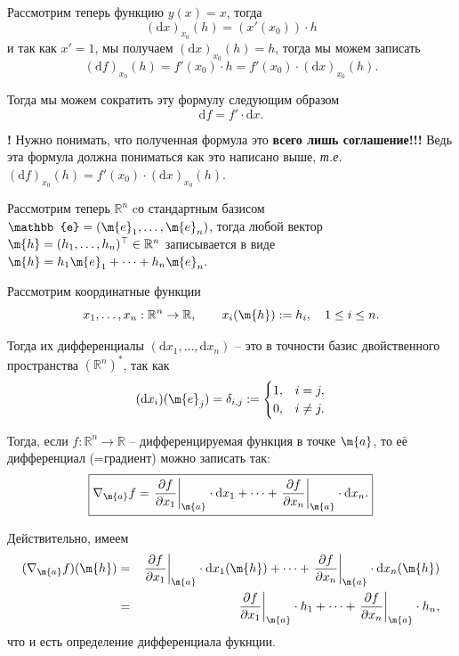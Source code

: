 Рассмотрим теперь функцию $y(x) = x$, тогда 
\[
 (\mathrm{d}x)_{x_0}(h) = (x'(x_0))\cdot h
\]
и так как $x' = 1$, мы получаем $(\mathrm{d}x)_{x_0}(h) = h$, тогда мы можем записать
\[
 (\mathrm{d}f)_{x_0}(h) = f'(x_0) \cdot h = f'(x_0) \cdot  (\mathrm{d}x)_{x_0}(h).
\]

Тогда мы можем сократить эту формулу следующим образом
\begin{equation}\label{df=f'dx}
  \boxed{
  \mathrm{d}f = f'\cdot \mathrm{d}x.
 }    
\end{equation}


\begin{mydanger}{\bf{!}}
    Нужно понимать, что полученная формула это \textbf{всего лишь соглашение!!!} Ведь эта формула должна пониматься как это написано выше, \textit{т.е.} $(\mathrm{d}f)_{x_0}(h) = f'(x_0) \cdot  (\mathrm{d}x)_{x_0}(h).$    
\end{mydanger}

\begin{remark}
Рассмотрим теперь $\mathbb{R}^n$ cо стандартным базисом $\mathbb{e} = (\m{e}_1,\ldots, \m{e}_n)$, тогда любой вектор $\m{h} = (h_1,\ldots, h_n)^\top  \in \mathbb{R}^n$ записывается в виде $\m{h} = h_1\m{e}_1 + \cdots + h_n \m{e}_n.$ 

Рассмотрим координатные функции 
\[
 x_1,\ldots, x_n:\mathbb{R}^n \to \mathbb{R}, \qquad x_i(\m{h}): = h_i, \quad 1 \le i \le n.
\]

Тогда их дифференциалы $(\mathrm{d}x_1, \ldots, \mathrm{d}x_n)$ -- это в точности базис двойственного пространства $(\mathbb{R}^n)^*$, так как
\[
 (\mathrm{d}x_i)(\m{e}_j) = \delta_{i,j}: = \begin{cases}
     1, & i = j, \\
     0, & i \ne j.
 \end{cases}
\]

Тогда, если $f:\mathbb{R}^n \to \mathbb{R}$ -- дифференцируемая функция в точке $\m{a}$, то её дифференциал (=градиент) можно записать так:
\begin{equation}\label{differential_via_dx}
  \boxed{
 \nabla_\m{a} f = \left.\frac{\partial f}{\partial x_1}\right|_\m{a} \cdot \mathrm{d}x_1 + \cdots +  \left.\frac{\partial f}{\partial x_n}\right|_\m{a} \cdot \mathrm{d}x_n.
    }    
\end{equation}

Действительно, имеем
\begin{eqnarray*}
    (\nabla_\m{a} f) (\m{h}) &=& \left.\frac{\partial f}{\partial x_1}\right|_\m{a} \cdot \mathrm{d}x_1(\m{h}) + \cdots +  \left.\frac{\partial f}{\partial x_n}\right|_\m{a} \cdot \mathrm{d}x_n (\m{h}) \\
    &=& \left.\frac{\partial f}{\partial x_1}\right|_\m{a} \cdot h_1 + \cdots +  \left.\frac{\partial f}{\partial x_n}\right|_\m{a} \cdot h_n ,
   \end{eqnarray*}
   что и есть определение дифференциала фукнции.
\end{remark}

